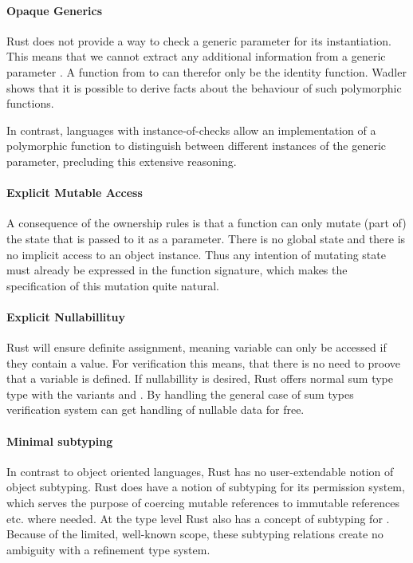 \documentclass[twoside, english]{sdqthesis}
\theoremstyle{definition}
\begin{document}
\paragraph*{Opaque Generics} Rust does not provide a way to check a generic parameter for its instantiation. This means that we cannot extract any additional information from a generic parameter . A function from  to  can therefor only be the identity function.
Wadler \cite{wadler_theorems_1989} shows that it is possible to derive facts about the behaviour of such polymorphic functions.

In contrast, languages with instance-of-checks allow an implementation of a polymorphic function to distinguish between different instances of the generic parameter, precluding this extensive reasoning.

\paragraph*{Explicit Mutable Access} A consequence of the ownership rules is that a function can only mutate (part of) the state that is passed to it as a parameter. There is no global state and there is no implicit access to an object instance. Thus any intention of mutating state must already be expressed in the function signature, which makes the specification of this mutation quite natural.

\paragraph*{Explicit Nullabillituy} Rust will ensure definite assignment, meaning variable can only be accessed if they contain a value. For verification this means, that there is no need to proove that a variable is defined. If nullabillity is desired, Rust offers normal sum type  type with the variants  and . 
By handling the general case of sum types verification system can get handling of nullable data for free.

\paragraph*{Minimal subtyping} In contrast to object oriented languages, Rust has no user-extendable notion of object subtyping. 
Rust does have a notion of subtyping for its permission system, which serves the purpose of coercing mutable references  to immutable references  etc. where needed. 
At the type level Rust also has a concept of subtyping for .
Because of the limited, well-known scope, these subtyping relations create no ambiguity with a refinement type system.
\end{document}
